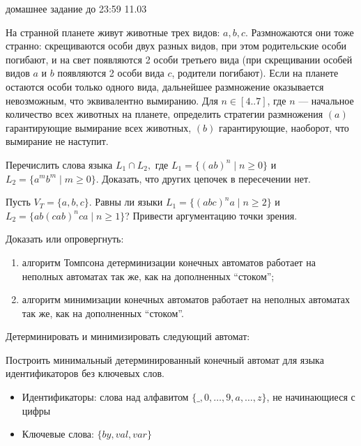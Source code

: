 \documentclass[12pt]{article}
\begin{document}

{\Large домашнее задание до 23:59 11.03}
\bigskip

\enumerate
{
  \item 
  {   
     На странной планете живут животные трех видов: $a, b, c$. Размножаются они тоже странно: скрещиваются особи двух разных видов, при этом родительские особи погибают, и на свет появляются 2 особи третьего вида (при скрещивании особей видов $a$ и $b$ появляются 2 особи вида $c$, родители погибают). Если на планете остаются особи только одного вида, дальнейшее размножение оказывается невозможным, что эквивалентно вымиранию. Для $n \in [4..7]$, где $n$ --- начальное количество всех животных на планете, определить стратегии размножения $(a)$ гарантирующие вымирание всех животных, $(b)$ гарантирующие, наоборот, что вымирание не наступит.
  }
  \item
  {
    Перечислить слова языка $L_1 \cap L_2,$ где $L_1 = \{ (ab)^n \mid n \geq 0 \}$ и $L_2 = \{ a^m b^m \mid m \geq 0 \}$. Доказать, что других цепочек в пересечении нет. 
  }
  \item
  {
    Пусть $V_T = \{a,b,c\}$. Равны ли языки $L_1 = \{ (abc)^n a \mid n \geq 2 \}$ и $L_2 = \{ ab (cab)^n ca \mid n \geq 1 \}$? Привести аргументацию точки зрения. 
  }
  \item
  {
    Доказать или опровергнуть: 
    \begin{enumerate}
      \item алгоритм Томпсона детерминизации конечных автоматов работает на неполных автоматах так же, как на дополненных ``стоком'';
      \item алгоритм минимизации конечных автоматов работает на неполных автоматах так же, как на дополненных ``стоком''.
    \end{enumerate}
  }
  \item { Детерминировать и минимизировать следующий автомат: 
  

  
  }
  \item { Построить минимальный детерминированный конечный автомат для языка идентификаторов без ключевых слов.
  \begin{itemize}
      \item Идентификаторы: слова над алфавитом $\{\_, 0, \dots, 9, a, \dots, z \}$, не начинающиеся с цифры
      \item Ключевые слова: $\{ by, val, var \}$
  \end{itemize}}
}
\end{document}
